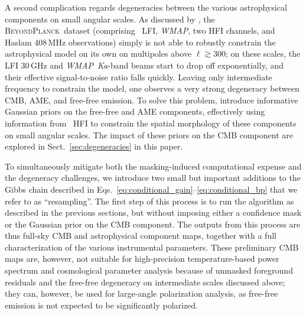 \documentclass[twocolumn]{aa}
\def\WMAP{\textit{WMAP}}
\newcommand{\BP}{\textsc{BeyondPlanck}}
\begin{document}
A second complication regards degeneracies between the various
astrophysical components on small angular scales. As discussed by
\citet{bp13}, the \BP\ dataset (comprising \Planck\ LFI, \WMAP, two
HFI channels, and Haslam 408\,MHz observations) simply is not able to
robustly constrain the astrophysical model on its own on multipoles
above $\ell\gtrsim 300$; on these scales, the LFI 30\,GHz and
\WMAP\ \textit{Ka}-band beams start to drop off exponentially, and their
effective signal-to-noise ratio falls quickly. Leaving only
intermediate frequency to constrain the model, one observes a very
strong degeneracy between CMB, AME, and free-free emission. To solve
this problem, \citet{bp13} introduce informative Gaussian priors on
the free-free and AME components, effectively using information from
\Planck\ HFI to constrain the spatial morphology of these components
on small angular scales. The impact of these priors on the CMB
component are explored in Sect.~\ref{sec:degeneracies} in this paper.

To simultaneously mitigate both the masking-induced computational
expense and the degeneracy challenges, we introduce two small
but important additions to the Gibbs chain described in
Eqs.~\eqref{eq:conditional_gain}--\eqref{eq:conditional_bp} that we
refer to as ``resampling''. The first step of this process is to run
the algorithm as described in the previous sections, but without
imposing either a confidence mask or the Gaussian prior on the CMB
component. The outputs from this process are thus full-sky CMB and
astrophysical component maps, together with a full characterization of
the various instrumental parameters. These preliminary CMB maps are,
however, not suitable for high-precision temperature-based power
spectrum and cosmological parameter analysis because of unmasked
foreground residuals and the free-free degeneracy on intermediate
scales discussed above; they can, however, be used for large-angle polarization
analysis, as free-free emission is not expected to be significantly polarized.
\end{document}
